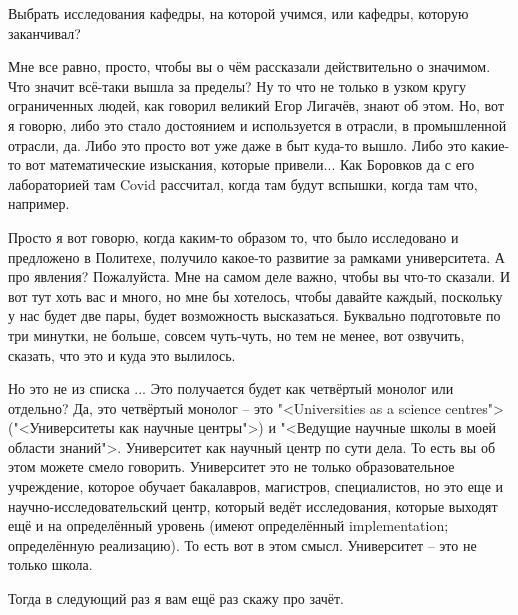 \documentclass[main.tex]{subfiles}
\begin{document}
Выбрать исследования кафедры, на которой учимся, или кафедры, которую заканчивал?

Мне все равно, просто, чтобы вы о чём рассказали действительно о значимом.
Что значит всё-таки вышла за пределы?
Ну то что не только в узком кругу ограниченных людей, как говорил великий Егор Лигачёв, знают об этом.
Но, вот я говорю, либо это стало достоянием и используется в отрасли, в промышленной отрасли, да.
Либо это просто вот уже даже в быт куда-то вышло.
Либо это какие-то вот математические изыскания, которые привели...
Как Боровков да с его лабораторией там Covid рассчитал, когда там будут вспышки, когда там что, например.

Просто я вот говорю, когда каким-то образом то, что было исследовано и предложено в Политехе, получило какое-то развитие за рамками университета.
А про явления?
Пожалуйста.
Мне на самом деле важно, чтобы вы что-то сказали.
И вот тут хоть вас и много, но мне бы хотелось, чтобы давайте каждый, поскольку у нас будет две пары, будет возможность высказаться.
Буквально подготовьте по три минутки, не больше, совсем чуть-чуть, но тем не менее, вот озвучить, сказать, что это и куда это вылилось.

Но это не из списка ...
Это получается будет как четвёртый монолог или отдельно?
Да, это четвёртый монолог -- это "<Universities as a science centres"> ("<Университеты как научные центры">) и "<Ведущие научные школы в моей области знаний">.
Университет как научный центр по сути дела.
То есть вы об этом можете смело говорить.
Университет это не только образовательное учреждение, которое обучает бакалавров, магистров, специалистов, но это еще и научно-исследовательский центр, который ведёт исследования, которые выходят ещё и на определённый уровень (имеют определённый implementation; определённую реализацию).
То есть вот в этом смысл.
Университет -- это не только школа.

Тогда в следующий раз я вам ещё раз скажу про зачёт.
\end{document}

